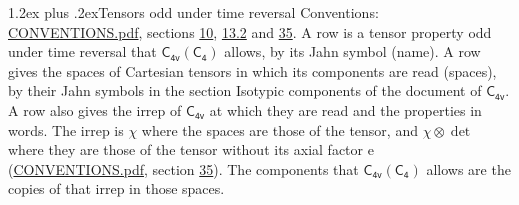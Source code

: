 \documentclass[10pt,a4paper]{article}
\makeatletter
\renewcommand\section{\@startsection{section}{1}{\z@}{-3ex plus -1ex minus -.2ex}%
  {1.2ex plus .2ex}{\normalfont\large\sffamily\bfseries\color{parttitle}}}
\numberwithin{equation}{section}
\newcommand{\grp}[1]{\mathsf{#1}}
\newcommand{\irrprod}{\otimes}
\makeatother
\begin{document}
\section{Tensors odd under time reversal}\label{s:time_odd}
Conventions: \href{../../CONVENTIONS.pdf}{CONVENTIONS.pdf}, sections \href{../../../rotation/CONVENTIONS.pdf\#conv.10}{10}, \href{../../../rotation/CONVENTIONS.pdf\#conv.13.2}{13.2} and \href{../../CONVENTIONS.pdf\#conv.35}{35}.
\leavevmode\label{n:head.name.property}A row is a tensor property odd under time reversal that $\grp{C_{4v}}(\grp{C_{4}})$ allows, by its Jahn symbol (name). \label{n:head.spaces}A row gives the spaces of Cartesian tensors in which its components are read (spaces), by their Jahn symbols in the section Isotypic components of the document of \href{../../../rotation/data/pdf/C4v.pdf}{$\grp{C_{4v}}$}. \label{n:head.properties}A row also gives the irrep of $\grp{C_{4v}}$ at which they are read and the properties in words. The irrep is $\chi$ where the spaces are those of the tensor, and $\chi \irrprod \det$ where they are those of the tensor without its axial factor e (\href{../../CONVENTIONS.pdf}{CONVENTIONS.pdf}, section \href{../../CONVENTIONS.pdf\#conv.35}{35}). The components that $\grp{C_{4v}}(\grp{C_{4}})$ allows are the copies of that irrep in those spaces.
\end{document}
